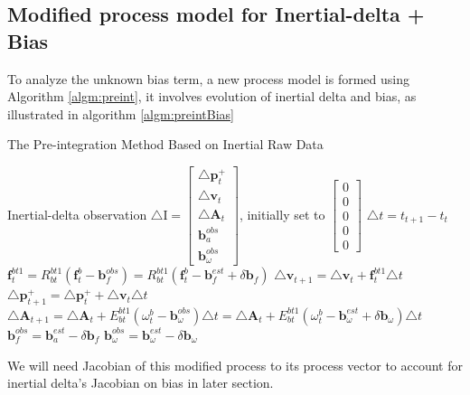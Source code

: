 \documentclass[12pt]{article}   %
\begin{document}
\subsection{Modified process model for Inertial-delta + Bias}
To analyze the unknown bias term, a new process model is formed using Algorithm \ref{algm:preint}, it involves evolution of inertial delta and bias, as illustrated in algorithm \ref{algm:preintBias}
\begin{algorithm}
	\caption{The Pre-integration Method Based on Inertial Raw Data}
	\label{algm:preintBias}		
	\begin{algorithmic}
		\STATE Inertial-delta observation $ \triangle \bm{\mathrm{I}} = \begin{bmatrix} 
		\triangle \textbf{p}_{t}^+ \\
		\triangle \textbf{v}_{t} \\
		\triangle \textbf{A} _{t} \\
		\textbf{b}_a^{obs} \\
		\textbf{b}_{\omega}^{obs}
		\end{bmatrix}$, initially set to $\begin{bmatrix} 
		0 \\ 
		0 \\ 
		0 \\
		0 \\
		0
		\end{bmatrix}$
		\STATE $\triangle t =  t_{t+1} - t_t$ 
		\STATE $\textbf{f}_t^{bt1} = R_{bt}^{bt1} (\textbf{f}_t^b - \textbf{b}_f^{obs}) = R_{bt}^{bt1} (\textbf{f}_t^b - \textbf{b}_f^{est} + \delta \bm{b}_f)$ 
		\STATE $\triangle \textbf{v}_{t+1} = \triangle \textbf{v}_{t} + \textbf{f}_t^{bt1} \triangle t$ 
		\STATE $\triangle \textbf{p}_{t+1}^+ = \triangle \textbf{p}_{t}^+ + \triangle \textbf{v}_t \triangle t$ 
		\STATE $\triangle \textbf{A} _{t+1} = \triangle \textbf{A} _{t} + E_{bt}^{bt1} (\omega _t^b - \textbf{b}_\omega^{obs} ) \triangle t= \triangle \textbf{A} _{t} + E_{bt}^{bt1} (\omega _t^b - \textbf{b}_\omega^{est} +  \delta \bm{b}_{\omega}) \triangle t$ 
		\STATE $\textbf{b}_f^{obs} = \textbf{b}_a^{est} - \delta \bm{b}_f$
		\STATE $\textbf{b}_{\omega}^{obs} = \textbf{b}_{\omega}^{est} -  \delta \bm{b}_{\omega}$
		\ENDFOR
	\end{algorithmic}
\end{algorithm}
We will need Jacobian of this modified process to its process vector to account for inertial delta's Jacobian on bias in later section.
\end{document}
